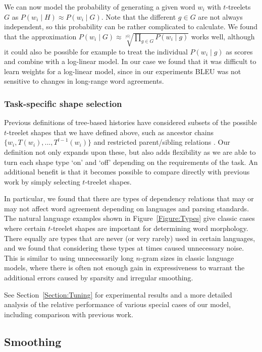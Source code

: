 \documentclass[english]{jnlp_1.4}
\begin{document}
We can now model the probability of generating a given word $w_i$ with
$t$-treelets $G$ as $P(w_i \mid H) \approx P(w_i \mid G)$. Note that the different
$g \in G$ are not always independent, so this probability can be rather complicated
to calculate.
We found that the approximation $P(w_i \mid G) \approx \sqrt[|G|]{\prod_{g \in G} P(w_i \mid g)}$
works well, although it could also be possible for example to treat the individual
$P(w_i \mid g)$ as scores and combine with a log-linear model.
In our case we found that it was difficult to learn weights for a log-linear model,
since in our experiments BLEU was not sensitive to changes in long-range word agreements.


\subsubsection{Task-specific shape selection}
\label{Section:ShapeSelection}

Previous definitions of tree-based histories have considered
subsets of the possible $t$-treelet shapes that we have defined above, such as ancestor chains
$\{w_i, T(w_i), ..., T^{l-1}(w_i)\}$ \cite{Gubbins13} and restricted parent/sibling relations
\cite{Shen08}. Our definition not only expands upon these, but also adds flexibility
as we are able to turn each shape type `on' and `off' depending on the requirements
of the task. An additional benefit is that it becomes possible to compare directly with previous work
by simply selecting $t$-treelet shapes.

In particular, we found that there are types of dependency relations that may or may
not affect word agreement depending on languages and parsing standards.
The natural language examples shown in Figure~\ref{Figure:Types} give classic cases where
certain $t$-treelet shapes are important for determining word morphology. There equally are
types that are never (or very rarely) used in certain languages, and we found that considering
these types at times caused unnecessary noise. This is similar to using unnecessarily long
$n$-gram sizes in classic language models, where there is often not enough gain in expressiveness
to warrant the additional errors caused by sparsity and irregular smoothing.

See Section~\ref{Section:Tuning} for experimental results and a more detailed analysis of
the relative performance of various special cases of our model, including comparison with previous work.


\subsection{Smoothing}
\label{Section:Smoothing}
\end{document}
